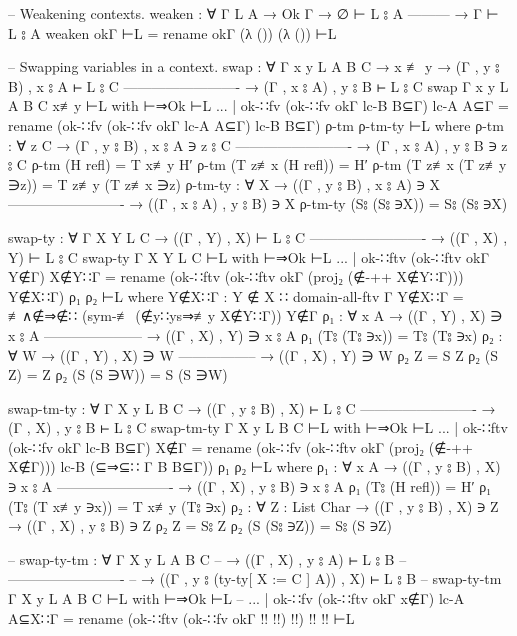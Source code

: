 \documentclass[logo,bsc,singlespacing,parskip,online]{infthesis}
\renewenvironment{code}{\mintedcopy[breaklines,breaksymbolleft=\;]{agda}}{\endmintedcopy}
\begin{document}
\begin{code}
  -- Weakening contexts.
  weaken : ∀ {Γ L A}
    → Ok Γ
    → ∅ ⊢ L ⦂ A
      ---------
    → Γ ⊢ L ⦂ A
  weaken okΓ ⊢L = rename okΓ (λ ()) (λ ()) ⊢L

  -- Swapping variables in a context.
  swap : ∀ {Γ x y L A B C}
    → x ≢ y
    → (Γ , y ⦂ B) , x ⦂ A ⊢ L ⦂ C
      -------------------------
    → (Γ , x ⦂ A) , y ⦂ B ⊢ L ⦂ C
  swap {Γ} {x} {y} {L} {A} {B} {C} x≢y ⊢L with ⊢⇒Ok ⊢L
  ... | ok-∷fv (ok-∷fv okΓ lc-B B⊆Γ) lc-A A⊆Γ =
    rename (ok-∷fv (ok-∷fv okΓ lc-A A⊆Γ) lc-B B⊆Γ) ρ-tm ρ-tm-ty ⊢L
    where
      ρ-tm : ∀ {z C}
        → (Γ , y ⦂ B) , x ⦂ A ∋ z ⦂ C
          -------------------------
        → (Γ , x ⦂ A) , y ⦂ B ∋ z ⦂ C
      ρ-tm (H refl) = T x≢y H′
      ρ-tm (T z≢x (H refl)) = H′
      ρ-tm (T z≢x (T z≢y ∋z)) = T z≢y (T z≢x ∋z)
      ρ-tm-ty : ∀ {X}
        → ((Γ , y ⦂ B) , x ⦂ A) ∋ X
          -------------------------
        → ((Γ , x ⦂ A) , y ⦂ B) ∋ X
      ρ-tm-ty (S⦂ (S⦂ ∋X)) = S⦂ (S⦂ ∋X)

  swap-ty : ∀ {Γ X Y L C}
    → ((Γ , Y) , X) ⊢ L ⦂ C
      -------------------------
    → ((Γ , X) , Y) ⊢ L ⦂ C
  swap-ty {Γ} {X} {Y} {L} {C} ⊢L with ⊢⇒Ok ⊢L
  ... | ok-∷ftv (ok-∷ftv okΓ Y∉Γ) X∉Y∷Γ = rename (ok-∷ftv (ok-∷ftv okΓ (proj₂ (∉-++ X∉Y∷Γ))) Y∉X∷Γ) ρ₁ ρ₂ ⊢L
    where
      Y∉X∷Γ : Y ∉ X ∷ domain-all-ftv Γ
      Y∉X∷Γ = ≢∧∉⇒∉∷ (sym-≢ (∉y∷ys⇒≢y X∉Y∷Γ)) Y∉Γ
      ρ₁ : ∀ {x A}
        → ((Γ , Y) , X) ∋ x ⦂ A
          ---------------------
        → ((Γ , X) , Y) ∋ x ⦂ A
      ρ₁ (T⦂ (T⦂ ∋x)) = T⦂ (T⦂ ∋x)
      ρ₂ : ∀ {W}
        → ((Γ , Y) , X) ∋ W
          -----------------
        → ((Γ , X) , Y) ∋ W
      ρ₂ Z = S Z
      ρ₂ (S Z) = Z
      ρ₂ (S (S ∋W)) = S (S ∋W)


  swap-tm-ty : ∀ {Γ X y L B C}
    → ((Γ , y ⦂ B) , X) ⊢ L ⦂ C
      -------------------------
    → (Γ , X) , y ⦂ B ⊢ L ⦂ C
  swap-tm-ty {Γ} {X} {y} {L} {B} {C} ⊢L with ⊢⇒Ok ⊢L
  ... | ok-∷ftv (ok-∷fv okΓ lc-B B⊆Γ) X∉Γ = rename (ok-∷fv (ok-∷ftv okΓ (proj₂ (∉-++ X∉Γ))) lc-B (⊆⇒⊆∷ {Γ} {B} B⊆Γ)) ρ₁ ρ₂ ⊢L
    where
      ρ₁ : ∀ {x A}
        → ((Γ , y ⦂ B) , X) ∋ x ⦂ A
          -------------------------
        → ((Γ , X) , y ⦂ B) ∋ x ⦂ A
      ρ₁ (T⦂ (H refl)) = H′
      ρ₁ (T⦂ (T x≢y ∋x)) = T x≢y (T⦂ ∋x)
      ρ₂ : ∀ {Z : List Char}
        → ((Γ , y ⦂ B) , X) ∋ Z
        → ((Γ , X) , y ⦂ B) ∋ Z
      ρ₂ Z = S⦂ Z
      ρ₂ (S (S⦂ ∋Z)) = S⦂ (S ∋Z)

  -- swap-ty-tm : ∀ {Γ X y L A B C}
  --   → ((Γ , X) , y ⦂ A) ⊢ L ⦂ B
  --     -------------------------
  --   → ((Γ , y ⦂ (ty-ty[ X := C ] A)) , X) ⊢ L ⦂ B
  -- swap-ty-tm {Γ} {X} {y} {L} {A} {B} {C} ⊢L with ⊢⇒Ok ⊢L
  -- ... | ok-∷fv (ok-∷ftv okΓ x∉Γ) lc-A A⊆X∷Γ = rename (ok-∷ftv (ok-∷fv okΓ {!!} {!!}) {!!}) {!!} {!!} ⊢L


\end{code}
\end{document}
